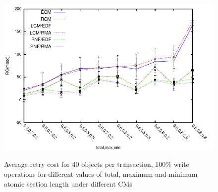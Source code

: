 \begin{figure}
{\includegraphics[scale=0.7]
{figures/Abr_dur_20t_420obj_100wr}
\label{fig:20t_ecm_rcm_lcm_pnf_420obj_100wr}
}
\caption{Average retry cost for 40 objects per transaction, 100\% write operations for different values of total, maximum and minimum atomic section length under different CMs}
\label{fig:cm_40obj_per_tx_100wr}
\end{figure}